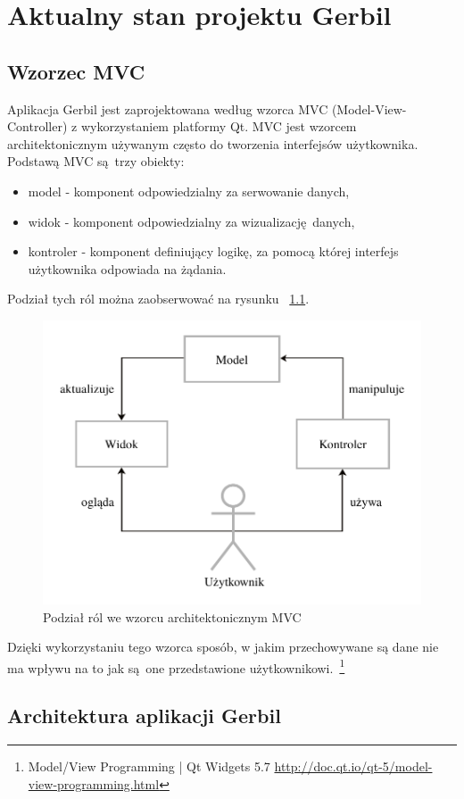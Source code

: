 \chapter{Aktualny stan projektu Gerbil}

 \section{Wzorzec MVC}

Aplikacja Gerbil jest zaprojektowana według wzorca MVC (Model-View-Controller) z wykorzystaniem platformy Qt. MVC jest wzorcem architektonicznym używanym często do tworzenia interfejsów użytkownika. Podstawą MVC są trzy obiekty:
\begin{itemize}
	\item model - komponent odpowiedzialny za serwowanie danych,
	\item widok - komponent odpowiedzialny za wizualizację danych,
	\item kontroler - komponent definiujący logikę, za pomocą której interfejs użytkownika odpowiada na żądania.
\end{itemize}
Podział tych ról można zaobserwować na rysunku ~\ref{fig:mvc}.

\begin{figure}[ht]
	\centering
	\includegraphics[width=0.7\linewidth]{rys04/mvc}
	\caption{Podział ról we wzorcu architektonicznym MVC}
	\label{fig:mvc}	
\end{figure}

Dzięki wykorzystaniu tego wzorca sposób, w jakim przechowywane są dane nie ma wpływu na to jak są one przedstawione użytkownikowi.~\footnote{Model/View Programming | Qt Widgets 5.7  \url{http://doc.qt.io/qt-5/model-view-programming.html}}

\section {Architektura aplikacji Gerbil}

